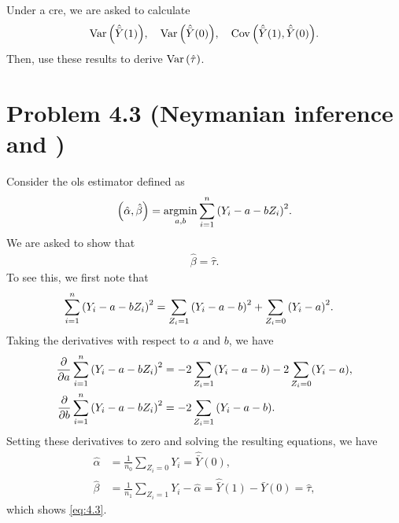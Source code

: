 \documentclass[10pt]{article}
\begin{document}
Under a \gls{cre},
we are asked to calculate
\begin{align*}
  \operatorname{Var}{\left( \hat{\bar{Y}}(1) \right)}, \quad
  \operatorname{Var}{\left( \hat{\bar{Y}}(0) \right)}, \quad
  \operatorname{Cov}{\left( \hat{\bar{Y}}(1), \hat{\bar{Y}}(0) \right)}.
\end{align*}
Then, use these results to derive $\operatorname{Var}{\left( \hat{\tau} \right)}$.

\section*{Problem 4.3 (Neymanian inference and )}

Consider the \gls{ols} estimator defined as
\begin{align*}
  {\left( \hat{\alpha}, \hat{\beta} \right)}
  = \operatorname*{argmin}_{a, b} \sum_{i=1}^n {\left( Y_i - a - b Z_i \right)}^2.
\end{align*}
We are asked to show that 
\begin{align*}
  \hat{\beta} = \hat{\tau}. \tag{4.3}
  \label{eq:4.3}
\end{align*}
To see this, we first note that
\begin{align*}
  \sum_{i=1}^n {\left( Y_i - a - b Z_i \right)}^2
  &= \sum_{Z_i = 1} {\left( Y_i - a - b \right)}^2 + \sum_{Z_i = 0} {\left( Y_i - a \right)}^2.
\end{align*}
Taking the derivatives with respect to $a$ and $b$,
we have
\begin{align*}
  \frac{\partial}{\partial a} \sum_{i=1}^n {\left( Y_i - a - b Z_i \right)}^2
  &= -2 \sum_{Z_i = 1} (Y_i - a - b) - 2 \sum_{Z_i = 0} (Y_i - a), \\
  \frac{\partial}{\partial b} \sum_{i=1}^n {\left( Y_i - a - b Z_i \right)}^2
  &= -2 \sum_{Z_i = 1} {\left( Y_i - a - b \right)}.
\end{align*}
Setting these derivatives to zero
and solving the resulting equations,
we have
\begin{align*}
  \hat{\alpha} 
  &= \frac{1}{n_0} \sum_{Z_i = 0} Y_i 
  = \hat{\bar{Y}}(0), \\
  \hat{\beta} 
  &= \frac{1}{n_1} \sum_{Z_i = 1} Y_i - \hat{\alpha}
  = \hat{\bar{Y}}(1) - \hat{\bar{Y}}(0) 
  = \hat{\tau},
\end{align*}
which shows \cref{eq:4.3}.
\end{document}
